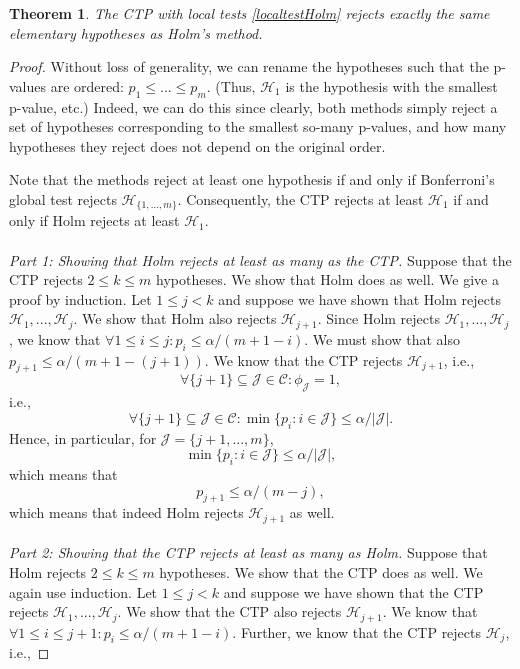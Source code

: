 \documentclass[11pt]{article}
\theoremstyle{plain}
\newtheorem{theorem}{Theorem}[section]
\theoremstyle{definition}
\newcommand{\J}{\mathcal{J}}
\newcommand{\Hy}{\mathcal{H}}
\newcommand{\subs}{\mathcal{C}}
\begin{document}
\begin{theorem} \label{thmHolmisCTP}
The  CTP with local tests  \eqref{localtestHolm} rejects exactly the same elementary hypotheses as Holm's method.
\end{theorem}
\begin{proof}
Without loss of generality, we can rename the hypotheses such that the  p-values are ordered: $p_{1}\leq ... \leq p_{m}$. (Thus, $\Hy_1$ is the hypothesis with the smallest p-value, etc.) Indeed, we can do this since clearly,  both methods simply reject a set of hypotheses corresponding to the smallest so-many p-values, and how many hypotheses they reject does not depend on the original order.

Note that  the methods reject at least one hypothesis if and only if Bonferroni's global test rejects $\Hy_{\{1,...,m\}}$.
Consequently,  the  CTP rejects at least $\Hy_{1}$ if and only if   Holm rejects at least $\Hy_{1}$.
\\
\\
\emph{Part 1: Showing that  Holm rejects at least as many as the CTP.}
Suppose that the CTP rejects $2\leq k \leq m$ hypotheses. We show that Holm does as well.
We give a proof by induction.
Let $1\leq j< k$ and suppose we have shown that Holm rejects $\Hy_1,...,\Hy_j$. We show that Holm also rejects $\Hy_{j+1}$.
Since Holm rejects  $\Hy_1,...,\Hy_j$, we know that $\forall 1\leq i\leq j:  p_i\leq \alpha/(m+1-i)$. We must show that also 
$p_{j+1}\leq \alpha/(m+1-(j+1))$. We know that the CTP rejects $\Hy_{j+1}$, i.e., 
$$ \forall \{{j+1}\} \subseteq \J \in \subs: \phi_{\J}=1  ,$$
i.e., 
$$ \forall\{{j+1}\} \subseteq \J \in \subs: \min\{p_i: i\in \J\}\leq \alpha/ |\J|.$$
Hence, in particular, for $\J=\{j+1,...,m\}$,
$$\min\{p_i: i\in \J\}\leq \alpha/ |\J|,$$
which means that
$$p_{j+1}\leq \alpha/ (m-j),$$ which means that indeed Holm rejects $\Hy_{j+1}$ as well.
\\
\\
\emph{Part 2: Showing that  the CTP rejects at least as many as Holm.}
Suppose that Holm rejects $2\leq k \leq m$ hypotheses. We show that the CTP does as well. We again use induction.
Let $1\leq j< k$ and suppose we have shown that the CTP  rejects $\Hy_1,...,\Hy_j$. We show that the CTP also rejects $\Hy_{j+1}$.
We know that 
$\forall 1\leq i\leq j+1:  p_i\leq \alpha/(m+1-i)$.
Further, we know that the CTP rejects $\Hy_j$, i.e.,

\end{proof}
\end{document}
